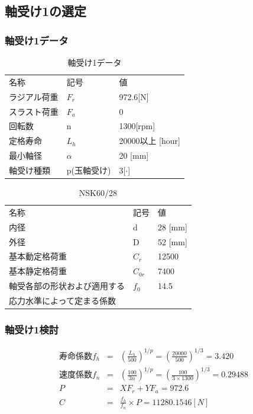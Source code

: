 \documentclass[a4j,twoside,openright,11pt]{jreport}
\begin{document}
\subsection{軸受け1の選定}
\subsubsection{軸受け1データ}
\begin{table}[htb]
\begin{center}
  \caption{軸受け1データ}
  \begin{tabular}{lll} \hline
名称&記号&値\\
ラジアル荷重&$F_r$&972.6[N]\\
スラスト荷重&$F_a$&0\\
回転数&n&1300[rpm]\\
定格寿命&$L_h$&20000以上 [hour]\\
最小軸径&$\alpha$&20 [mm]\\
軸受け種類&p(玉軸受け)&3[$\cdot$]\\
\hline
  \end{tabular}
\end{center}
\end{table}

\begin{table}[htb]
\begin{center}
  \caption{NSK60/28}
  \begin{tabular}{lll} \hline
名称&記号&値\\
内径& d &28 [mm]\\
外径& D &52 [mm]\\
基本動定格荷重&$C_{r}$&12500\\
基本静定格荷重&$C_{0r}$&7400\\
軸受各部の形状および適用する&$f_0$&14.5\\
応力水準によって定まる係数&&\\
\hline
  \end{tabular}
\end{center}
\end{table}


\subsubsection{軸受け1検討}
\begin{eqnarray}
寿命係数f_h &=& \left( \frac{L_h}{500} \right)^{1/p} = \left( \frac{20000}{500} \right)^{1/3} = 3.420\\
速度係数f_n &=& \left( \frac{100}{3n} \right)^{1/p} = \left( \frac{100}{3 \times 1300} \right)^{1/3} = 0.29488\\
P &=& XF_r+YF_a = 972.6\\
C &=& \frac{f_h}{f_n} \times P = 11280.1546[N]
\end{eqnarray}
\end{document}
